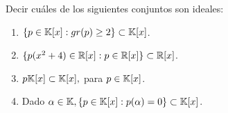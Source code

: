 \item Decir cuáles de los siguientes conjuntos son ideales:
    \begin{enumerate}
        \item $\{p\in\mathbb{K}[x]:gr(p)\geq2\}\subset\mathbb{K}[x]$.
            \begin{mdframed}[style=s]
                
            \end{mdframed}
        \item $\{p(x^2+4)\in\mathbb{R}[x]:p\in\mathbb{R}[x]\}\subset\mathbb{R}[x]$.
            \begin{mdframed}[style=s]
                
            \end{mdframed}
        \item $p\mathbb{K}[x]\subset\mathbb{K}[x],$ para $p\in\mathbb{K}[x]$.
            \begin{mdframed}[style=s]
                
            \end{mdframed}
        \item Dado $\alpha\in\mathbb{K}, \{p\in\mathbb{K}[x]:p(\alpha)=0\}\subset\mathbb{K}[x]$.
            \begin{mdframed}[style=s]
                
            \end{mdframed}
    \end{enumerate}